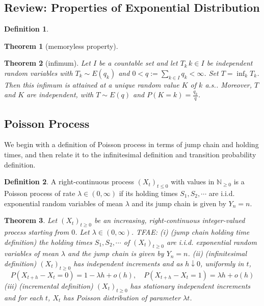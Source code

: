 \documentclass{article}
\newtheorem{Thm}{Theorem}[section]
\theoremstyle{definition}
\newtheorem{Def}{Definition}[section]
\renewcommand{\leq}{\leqslant}
\renewcommand{\geq}{\geqslant}
\newcommand{\<}{\left\langle}
\renewcommand{\>}{\right\rangle}
\begin{document}
\subsection{Review: Properties of Exponential Distribution}
\begin{Def}
    
\end{Def}
\begin{Thm}[memoryless property]
    
\end{Thm}
\begin{Thm}[infimum]
    Let $I$ be a countable set and let $T_k\,k\in I$ be independent random variables with $T_k \sim E(q_k)$ and $0 < q := \sum_{k\in I} q_k < \infty$. 
    Set $T = \inf_k T_k$. Then this infimum is attained at a unique random value $K$ of $k$ a.s.. Moreover, $T$ and $K$ are independent, with $T \sim E(q)$ and $P(K = k) = \frac{q_k}{q}$.

\end{Thm}

\subsection{Poisson Process}

We begin with a definition of Poisson process in terms of jump chain and holding times, and then relate it to
the infinitesimal definition and transition probability definition.
\begin{Def}
    A right-continuous process $(X_t)_{t\leq 0}$ with values in $\mathbb{N}_{\geq 0}$ is a Poisson process of rate $\lambda\in (0,\infty)$
    if its holding times $S_1,S_2,\cdots$ are i.i.d. exponential random variables of mean $\lambda$ and its jump chain is given by $Y_n=n$.
\end{Def}

\begin{Thm}
    Let $(X_t)_{t\geq 0}$ be an increasing, right-continuous integer-valued process starting from $0$. Let $\lambda\in(0,\infty)$. TFAE:\newline 
    (i) (jump chain holding time definition) the holding times $S_1,S_2,\cdots$ of $(X_t)_{t\geq 0}$ are i.i.d. exponential random variables of mean $\lambda$ 
    and the jump chain is given by $Y_n=n$.\newline 
    (ii) (infinitesimal definition) $(X_t)_{t\geq 0}$ has independent increments and as $h\downarrow 0$, uniformly in $t$,
    \[P(X_{t+h}-X_t=0)=1-\lambda h+o(h),\quad P(X_{t+h}-X_t=1)=\lambda h+o(h)\]\newline 
    (iii) (incremental definition) $(X_t)_{t\geq 0}$ has stationary independent increments and for each $t$, $X_t$ has Poisson distribution of parameter $\lambda t$.
\end{Thm}
\end{document}
